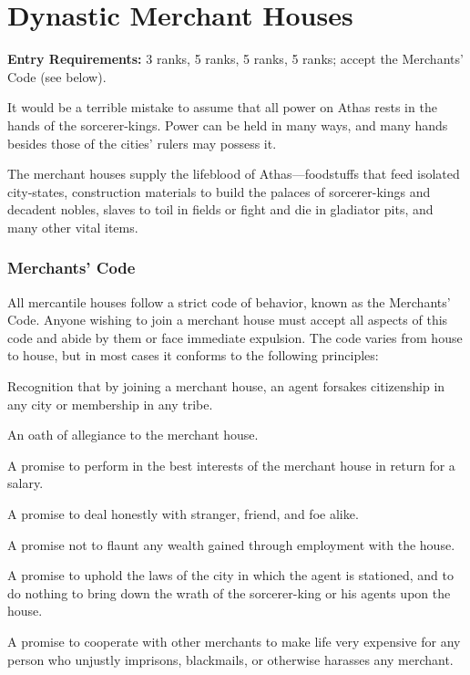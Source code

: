\section{Dynastic Merchant Houses}

\textbf{Entry Requirements:}  3 ranks,  5 ranks,  5 ranks,  5 ranks; accept the Merchants' Code (see below).

It would be a terrible mistake to assume that all power on Athas rests in the hands of the sorcerer-kings. Power can be held in many ways, and many hands besides those of the cities' rulers may possess it.

The merchant houses supply the lifeblood of Athas---foodstuffs that feed isolated city‐states, construction materials to build the palaces of sorcerer-kings and decadent nobles, slaves to toil in fields or fight and die in gladiator pits, and many other vital items.

\subsubsection{Merchants' Code}
All mercantile houses follow a strict code of behavior, known as the Merchants' Code. Anyone wishing to join a merchant house must accept all aspects of this code and abide by them or face immediate expulsion. The code varies from house to house, but in most cases it conforms to the following principles:

\begin{enumerate*}
\item Recognition that by joining a merchant house, an agent forsakes citizenship in any city or membership in any tribe.
\item An oath of allegiance to the merchant house.
\item A promise to perform in the best interests of the merchant house in return for a salary.
\item A promise to deal honestly with stranger, friend, and foe alike.
\item A promise not to flaunt any wealth gained through employment with the house.
\item A promise to uphold the laws of the city in which the agent is stationed, and to do nothing to bring down the wrath of the sorcerer-king or his agents upon the house.
\item A promise to cooperate with other merchants to make life very expensive for any person who unjustly imprisons, blackmails, or otherwise harasses any merchant.
\end{enumerate*}

